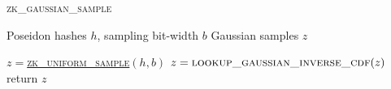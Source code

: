 \begin{algorithm}[htbp]
\begin{algorithmic}[1]
   \caption{\textsc{zk\_gaussian\_sample}}
   \label{alg:zk_gaussian_sample}
     Poseidon hashes $h$, sampling bit-width $b$
     Gaussian samples $z$

    \STATE $z = $\hyperref[alg:zk_uniform_sample]{\textsc{zk\_uniform\_sample}}$(h, b)$
    \STATE $z = \textsc{lookup\_gaussian\_inverse\_cdf}(z)$
    \STATE return $z$
\end{algorithmic}
\end{algorithm}